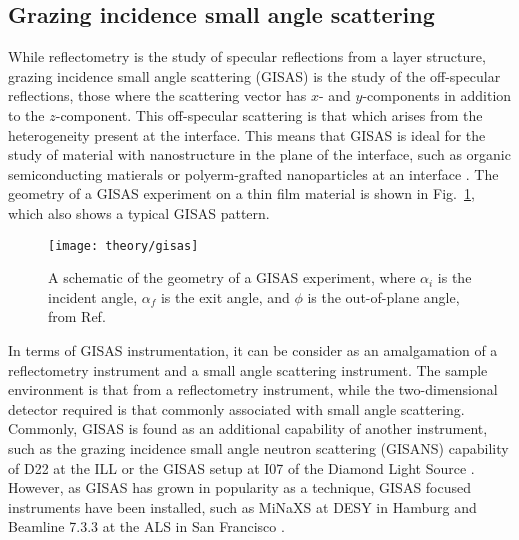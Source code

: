 \subsection{Grazing incidence small angle scattering}

While reflectometry is the study of specular reflections from a layer structure, grazing incidence small angle scattering (GISAS) is the study of the off-specular reflections, those where the scattering vector has $x$- and $y$-components in addition to the $z$-component. 
This off-specular scattering is that which arises from the heterogeneity present at the interface. 
This means that GISAS is ideal for the study of material with nanostructure in the plane of the interface, such as organic semiconducting matierals or polyerm-grafted nanoparticles at an interface \cite{MullerBuschbaum2005,Zhang2017}.
The geometry of a GISAS experiment on a thin film material is shown in Fig.~\ref{fig:gisas}, which also shows a typical GISAS pattern. 
%
\begin{figure}
	\centering
	\texttt{[image: theory/gisas]}
	\caption{A schematic of the geometry of a GISAS experiment, where $\alpha_i$ is the incident angle, $\alpha_f$ is the exit angle, and $\phi$ is the out-of-plane angle, from Ref.~\cite{MuellerBuschbaum2009}}
	\label{fig:gisas}
\end{figure}
%

In terms of GISAS instrumentation, it can be consider as an amalgamation of a reflectometry instrument and a small angle scattering instrument. 
The sample environment is that from a reflectometry instrument, while the two-dimensional detector required is that commonly associated with small angle scattering. 
Commonly, GISAS is found as an additional capability of another instrument, such as the grazing incidence small angle neutron scattering (GISANS) capability of D22 at the ILL or the GISAS setup at I07 of the Diamond Light Source \cite{MullerBuschbaum2004,Nicklin2016}.
However, as GISAS has grown in popularity as a technique, GISAS focused instruments have been installed, such as MiNaXS at DESY in Hamburg and Beamline 7.3.3 at the ALS in San Francisco \cite{Buffet2012,Hexemer2010}.
